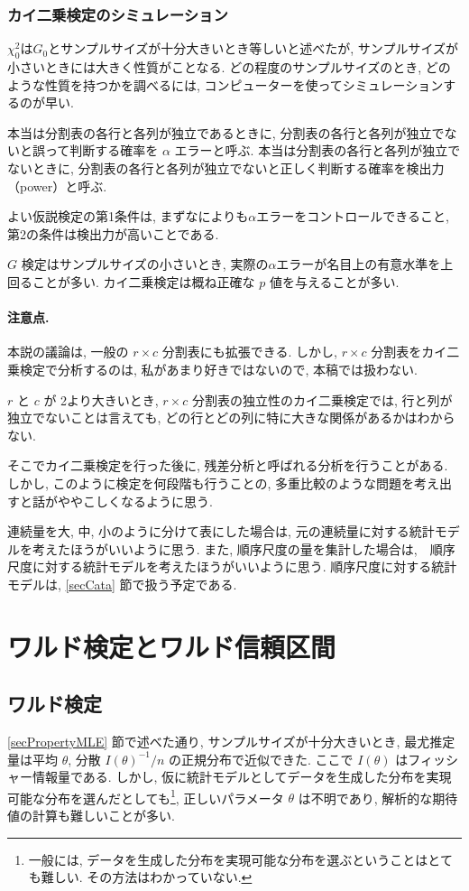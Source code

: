 \documentclass[a4paper, 12pt]{jarticle}
\begin{document}
\subsubsection{カイ二乗検定のシミュレーション}
$\chi^2_0$は$G_0$とサンプルサイズが十分大きいとき等しいと述べたが, サンプルサイズが小さいときには大きく性質がことなる.
どの程度のサンプルサイズのとき, どのような性質を持つかを調べるには, コンピューターを使ってシミュレーションするのが早い. 

本当は分割表の各行と各列が独立であるときに, 分割表の各行と各列が独立でないと誤って判断する確率を $\alpha$ エラーと呼ぶ.
本当は分割表の各行と各列が独立でないときに, 分割表の各行と各列が独立でないと正しく判断する確率を検出力（power）と呼ぶ.

よい仮説検定の第1条件は, まずなによりも$\alpha$エラーをコントロールできること, 第2の条件は検出力が高いことである. 

$G$ 検定はサンプルサイズの小さいとき, 実際の$\alpha$エラーが名目上の有意水準を上回ることが多い. 
カイ二乗検定は概ね正確な $p$ 値を与えることが多い.

\paragraph{注意点. } 本説の議論は, 一般の $r \times c$ 分割表にも拡張できる. しかし, $r \times c$ 分割表をカイ二乗検定で分析するのは, 私があまり好きではないので, 本稿では扱わない.

$r$ と $c$ が 2より大きいとき, $r \times c$ 分割表の独立性のカイ二乗検定では, 行と列が独立でないことは言えても, どの行とどの列に特に大きな関係があるかはわからない. 

そこでカイ二乗検定を行った後に, 残差分析と呼ばれる分析を行うことがある. しかし, このように検定を何段階も行うことの, 多重比較のような問題を考え出すと話がややこしくなるように思う.  

連続量を大, 中, 小のように分けて表にした場合は, 元の連続量に対する統計モデルを考えたほうがいいように思う. また, 順序尺度の量を集計した場合は,　順序尺度に対する統計モデルを考えたほうがいいように思う. 
順序尺度に対する統計モデルは, \ref{secCata} 節で扱う予定である. 

\section{ワルド検定とワルド信頼区間}
\subsection{ワルド検定}
\label{secWaldtest}
\ref{secPropertyMLE} 節で述べた通り, サンプルサイズが十分大きいとき, 最尤推定量は平均 $\theta$, 分散 $I(\theta)^{-1}/n$ の正規分布で近似できた. ここで $I(\theta)$ はフィッシャー情報量である. 
しかし, 仮に統計モデルとしてデータを生成した分布を実現可能な分布を選んだとしても\footnote{一般には, データを生成した分布を実現可能な分布を選ぶということはとても難しい. その方法はわかっていない. }, 正しいパラメータ $\theta$ は不明であり, 解析的な期待値の計算も難しいことが多い. 
 
\end{document}
